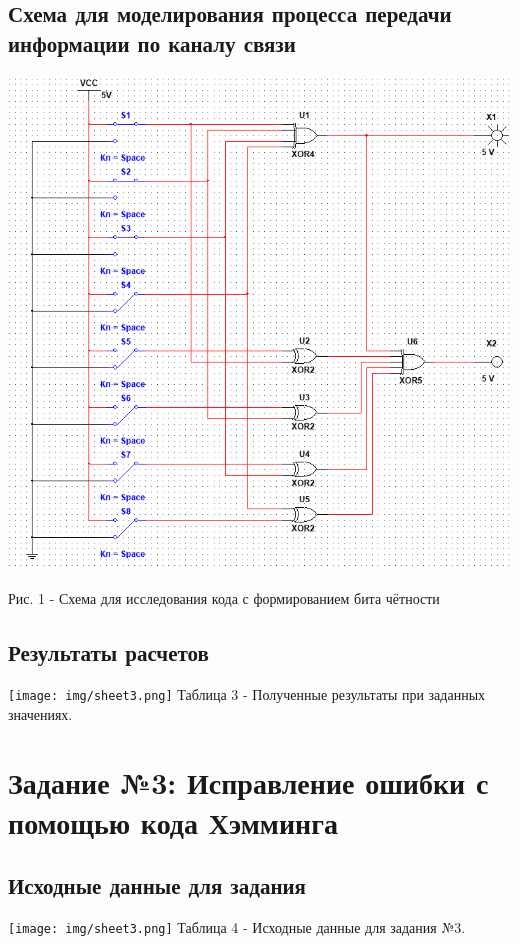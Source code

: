 \documentclass[11pt]{article}
\begin{document}
\subsection{Схема для моделирования процесса передачи информации по каналу связи}
\includegraphics[width=1\linewidth]{img/scheme1.png}
\begin{center}
    Рис. 1 - Схема для исследования кода с формированием бита чётности
\end{center}

\subsection{Результаты расчетов}
\begin{center}
    \texttt{[image: img/sheet3.png]}
        Таблица 3 - Полученные результаты при заданных значениях.
\end{center}


\newpage
\section{Задание №3: Исправление ошибки с помощью кода Хэмминга}
\subsection{Исходные данные для задания}
\begin{center}
    \texttt{[image: img/sheet3.png]}
        Таблица 4 - Исходные данные для задания №3.
\end{center}
\end{document}
